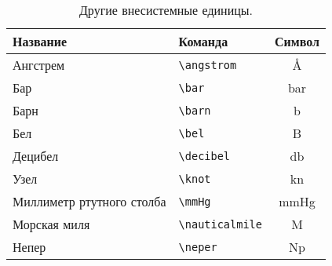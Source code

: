 \begin{table}
    \caption{Другие внесистемные единицы.}\label{tab:unit:other}
    \centering
    \begin{tabular}{llc}
        \toprule
        Название                  & Команда                 & Символ             \\
        \midrule
        Ангстрем                  & \verb|\angstrom| & \si{\angstrom}     \\
        Бар                       & \verb|\bar| & \si{\bar}          \\
        Барн                      & \verb|\barn| & \si{\barn}         \\
        Бел                       & \verb|\bel| & \si{\bel}          \\
        Децибел                   & \verb|\decibel| & \si{\decibel}      \\
        Узел                      & \verb|\knot| & \si{\knot}         \\
        Миллиметр ртутного столба & \verb|\mmHg| & \si{\mmHg}         \\
        Морская миля              & \verb|\nauticalmile| & \si{\nauticalmile} \\
        Непер                     & \verb|\neper| & \si{\neper}        \\
        \bottomrule
    \end{tabular}
\end{table}

